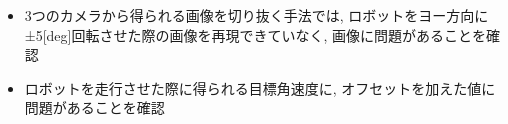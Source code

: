 \begin{itemize}
  \item 3つのカメラから得られる画像を切り抜く手法では, ロボットをヨー方向に±5[deg]回転させた際の画像を再現できていなく, 画像に問題があることを確認
  \item ロボットを走行させた際に得られる目標角速度に, オフセットを加えた値に問題があることを確認
\end{itemize}



